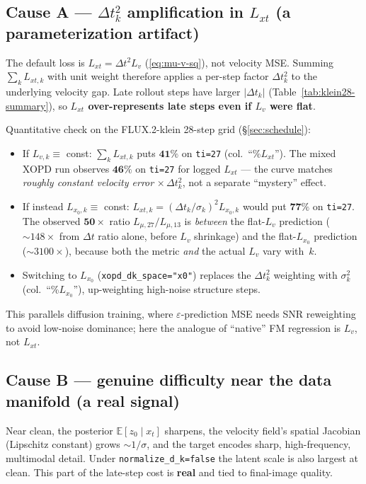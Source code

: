 \documentclass[11pt,a4paper]{article}
\newcommand{\E}{\mathbb{E}}
\newcommand{\dt}{\Delta t}
\begin{document}
\subsection[Cause A: step-size amplification]
{Cause A --- $\dt_k^2$ amplification in $L_{xt}$ (a parameterization artifact)}
\label{ssec:causeA}

The default loss is $L_{xt}=\dt^2 L_v$ (\eqref{eq:mu-v-sq}), not velocity MSE. Summing
$\sum_k L_{xt,k}$ with unit weight therefore applies a per-step factor $\dt_k^2$ to the underlying
velocity gap. Late rollout steps have larger $\lvert\dt_k\rvert$ (Table~\ref{tab:klein28-summary}),
so \textbf{$L_{xt}$ over-represents late steps even if $L_v$ were flat}.

Quantitative check on the FLUX.2-klein 28-step grid (\S\ref{sec:schedule}):
\begin{itemize}[leftmargin=1.5em]
\item If $L_{v,k}\equiv$ const: $\sum_k L_{xt,k}$ puts $\mathbf{41\%}$ on \texttt{ti=27}
(col.~``\%$L_{xt}$''). The mixed XOPD run observes $\mathbf{46\%}$ on \texttt{ti=27} for logged
$L_{xt}$ --- the curve matches \emph{roughly constant velocity error} $\times\,\dt_k^2$, not a
separate ``mystery'' effect.
\item If instead $L_{x_0,k}\equiv$ const: $L_{xt,k}=(\dt_k/\sigma_k)^2 L_{x_0,k}$ would put
$\mathbf{77\%}$ on \texttt{ti=27}. The observed $\mathbf{50\times}$ ratio $L_{\mu,27}/L_{\mu,13}$
is \emph{between} the flat-$L_v$ prediction ($\sim148\times$ from $\dt$ ratio alone, before
$L_v$ shrinkage) and the flat-$L_{x_0}$ prediction ($\sim3100\times$), because both the metric
\emph{and} the actual $L_v$ vary with~$k$.
\item Switching to $L_{x_0}$ (\texttt{xopd\_dk\_space="x0"}) replaces the $\dt_k^2$ weighting with
$\sigma_k^2$ (col.~``\%$L_{x_0}$''), up-weighting high-noise structure steps.
\end{itemize}
This parallels diffusion training, where $\varepsilon$-prediction MSE needs SNR reweighting to avoid
low-noise dominance; here the analogue of ``native'' FM regression is $L_v$, not $L_{xt}$.

\subsection{Cause B --- genuine difficulty near the data manifold (a real signal)}
\label{ssec:causeB}

Near clean, the posterior $\E[z_0\mid x_t]$ sharpens, the velocity field's spatial Jacobian
(Lipschitz constant) grows $\sim 1/\sigma$, and the target encodes sharp, high-frequency, multimodal
detail. Under \texttt{normalize\_d\_k=false} the latent scale is also largest at clean. This part of
the late-step cost is \textbf{real} and tied to final-image quality.
\end{document}
